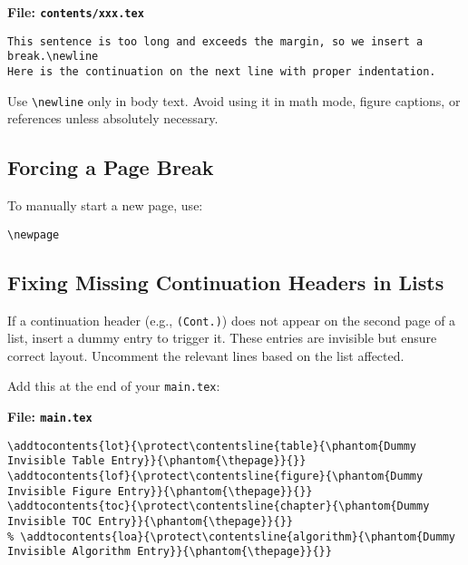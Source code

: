\documentclass{VISTEC}
\begin{document}
\noindent\textbf{File: \texttt{contents/xxx.tex}}\vspace{-1.5em}
\begin{verbatim}
This sentence is too long and exceeds the margin, so we insert a break.\newline
Here is the continuation on the next line with proper indentation.
\end{verbatim}

\begin{subparagraph}
Use \verb|\newline| only in body text. Avoid using it in math mode, figure captions, or references unless absolutely necessary.
\end{subparagraph}

\subsection{Forcing a Page Break}

\begin{subparagraph}
To manually start a new page, use:
\end{subparagraph}

\begin{verbatim}
\newpage
\end{verbatim}

\subsection{Fixing Missing Continuation Headers in Lists}


\begin{subparagraph}
If a continuation header (e.g., \texttt{(Cont.)}) does not appear on the second page of a list, insert a dummy entry to trigger it. These entries are invisible but ensure correct layout. Uncomment the relevant lines based on the list affected.
\end{subparagraph}

\begin{subparagraph}
Add this at the end of your \texttt{main.tex}:
\end{subparagraph}

\noindent\textbf{File: \texttt{main.tex}}\vspace{-1.5em}
\begin{verbatim}
\addtocontents{lot}{\protect\contentsline{table}{\phantom{Dummy Invisible Table Entry}}{\phantom{\thepage}}{}}
\addtocontents{lof}{\protect\contentsline{figure}{\phantom{Dummy Invisible Figure Entry}}{\phantom{\thepage}}{}}
\addtocontents{toc}{\protect\contentsline{chapter}{\phantom{Dummy Invisible TOC Entry}}{\phantom{\thepage}}{}}
% \addtocontents{loa}{\protect\contentsline{algorithm}{\phantom{Dummy Invisible Algorithm Entry}}{\phantom{\thepage}}{}}
\end{verbatim}
\end{document}
